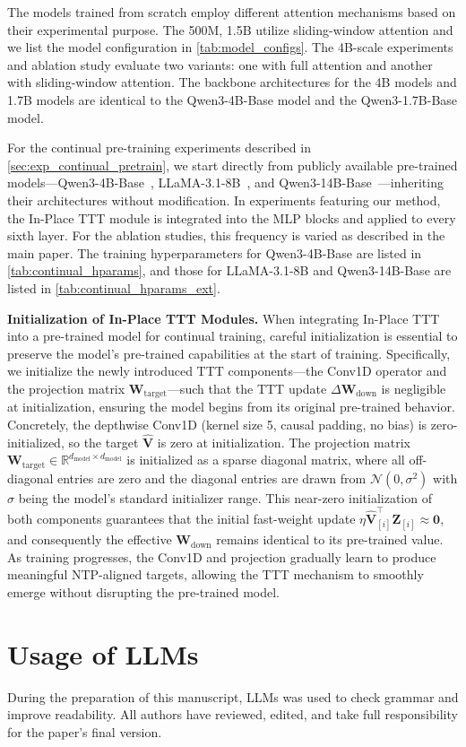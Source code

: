 The models trained from scratch employ different attention mechanisms based on their experimental purpose. The 500M, 1.5B utilize sliding-window attention and we list the model configuration in \cref{tab:model_configs}. The 4B-scale experiments and ablation study evaluate two variants: one with full attention and another with sliding-window attention. The backbone architectures for the 4B models and 1.7B models are identical to the Qwen3-4B-Base model and the Qwen3-1.7B-Base model.

For the continual pre-training experiments described in \cref{sec:exp_continual_pretrain}, we start directly from publicly available pre-trained models---Qwen3-4B-Base~\citep{yang2025qwen3}, LLaMA-3.1-8B~\citep{grattafiori2024llama}, and Qwen3-14B-Base~\citep{yang2025qwen3}---inheriting their architectures without modification. In experiments featuring our method, the In-Place TTT module is integrated into the MLP blocks and applied to every sixth layer. For the ablation studies, this frequency is varied as described in the main paper. The training hyperparameters for Qwen3-4B-Base are listed in \cref{tab:continual_hparams}, and those for LLaMA-3.1-8B and Qwen3-14B-Base are listed in \cref{tab:continual_hparams_ext}.

\textbf{Initialization of In-Place TTT Modules.}
When integrating In-Place TTT into a pre-trained model for continual training, careful initialization is essential to preserve the model's pre-trained capabilities at the start of training. Specifically, we initialize the newly introduced TTT components---the Conv1D operator and the projection matrix $\mathbf{W}_{\text{target}}$---such that the TTT update $\Delta \mathbf{W}_{\text{down}}$ is negligible at initialization, ensuring the model begins from its original pre-trained behavior. Concretely, the depthwise Conv1D (kernel size 5, causal padding, no bias) is zero-initialized, so the target $\hat{\mathbf{V}}$ is zero at initialization. The projection matrix $\mathbf{W}_{\text{target}} \in \mathbb{R}^{d_{\text{model}} \times d_{\text{model}}}$ is initialized as a sparse diagonal matrix, where all off-diagonal entries are zero and the diagonal entries are drawn from $\mathcal{N}(0, \sigma^2)$ with $\sigma$ being the model's standard initializer range. This near-zero initialization of both components guarantees that the initial fast-weight update $\eta \hat{\mathbf{V}}_{[i]}^\top \mathbf{Z}_{[i]} \approx \mathbf{0}$, and consequently the effective $\mathbf{W}_{\text{down}}$ remains identical to its pre-trained value. As training progresses, the Conv1D and projection gradually learn to produce meaningful NTP-aligned targets, allowing the TTT mechanism to smoothly emerge without disrupting the pre-trained model.


\section{Usage of LLMs}
During the preparation of this manuscript, LLMs was used to check grammar and improve readability. All authors have reviewed, edited, and take full responsibility for the paper's final version.




